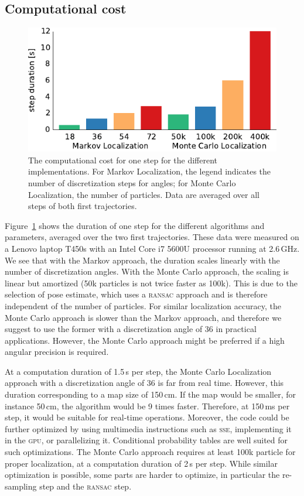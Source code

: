 \documentclass[letterpaper, 10pt, conference]{ieeeconf}
\newcommand{\Fig}[1]{Figure~\ref{fig:#1}}
\begin{document}
\subsection{Computational cost}

\begin{figure}
\includegraphics{cpu_load}
\caption{The computational cost for one step for the different implementations.
For Markov Localization, the legend indicates the number of discretization steps for angles; for Monte Carlo Localization, the number of particles.
Data are averaged over all steps of both first trajectories.}
\label{fig:cpuload}
\end{figure}

\Fig{cpuload} shows the duration of one step for the different algorithms and parameters, averaged over the two first trajectories.
These data were measured on a Lenovo laptop T450s with an Intel Core i7 5600U processor running at 2.6\,GHz.
We see that with the Markov approach, the duration scales linearly with the number of discretization angles.
With the Monte Carlo approach, the scaling is linear but amortized (50k particles is not twice faster as 100k).
This is due to the selection of pose estimate, which uses a \textsc{ransac} approach and is therefore independent of the number of particles.
For similar localization accuracy, the Monte Carlo approach is slower than the Markov approach, and therefore we suggest to use the former with a discretization angle of 36 in practical applications.
However, the Monte Carlo approach might be preferred if a high angular precision is required.

At a computation duration of 1.5\,s per step, the Monte Carlo Localization approach with a discretization angle of 36 is far from real time.
However, this duration corresponding to a map size of 150\,cm.
If the map would be smaller, for instance 50\,cm, the algorithm would be 9 times faster.
Therefore, at 150\,ms per step, it would be suitable for real-time operations.
Moreover, the code could be further optimized by using multimedia instructions such as \textsc{sse}, implementing it in the \textsc{gpu}, or parallelizing it.
Conditional probability tables are well suited for such optimizations.
The Monte Carlo approach requires at least 100k particle for proper localization, at a computation duration of 2\,s per step.
While similar optimization is possible, some parts are harder to optimize, in particular the re-sampling step and the \textsc{ransac} step.
\end{document}
